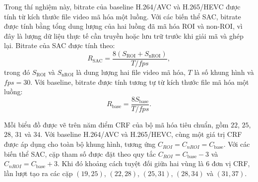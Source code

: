 Trong thí nghiệm này, bitrate của baseline H.264/AVC và H.265/HEVC được tính từ kích thước file video mã hóa một luồng. Với các biến thể SAC, bitrate được tính bằng tổng dung lượng của hai luồng đã mã hóa ROI và non-ROI, vì đây là lượng dữ liệu thực tế cần truyền hoặc lưu trữ trước khi giải mã và ghép lại. Bitrate của SAC được tính theo:
\begin{equation}
  R_{\text{SAC}} =
  \frac{8\left(S_{\text{ROI}} + S_{\text{nROI}}\right)}{T/fps},
  \label{eq:sac-bitrate}
\end{equation}
trong đó $S_{\text{ROI}}$ và $S_{\text{nROI}}$ là dung lượng hai file video mã hóa, $T$ là số khung hình và $fps=30$. Với baseline, bitrate được tính tương tự từ kích thước file mã hóa một luồng:
\begin{equation}
  R_{\text{base}} =
  \frac{8S_{\text{base}}}{T/fps}.
  \label{eq:base-bitrate}
\end{equation}

Mỗi biểu đồ được vẽ trên năm điểm CRF của bộ mã hóa tiêu chuẩn, gồm $22$, $25$, $28$, $31$ và $34$. Với baseline H.264/AVC và H.265/HEVC, cùng một giá trị CRF được áp dụng cho toàn bộ khung hình, tương ứng $C_{ROI}=C_{nROI}=C_{\text{base}}$. Với các biến thể SAC, cặp tham số được đặt theo quy tắc $C_{ROI}=C_{\text{base}}-3$ và $C_{nROI}=C_{\text{base}}+3$. Khi đó khoảng cách tuyệt đối giữa hai vùng là 6 đơn vị CRF, lần lượt tạo ra các cặp $(19,25)$, $(22,28)$, $(25,31)$, $(28,34)$ và $(31,37)$.

